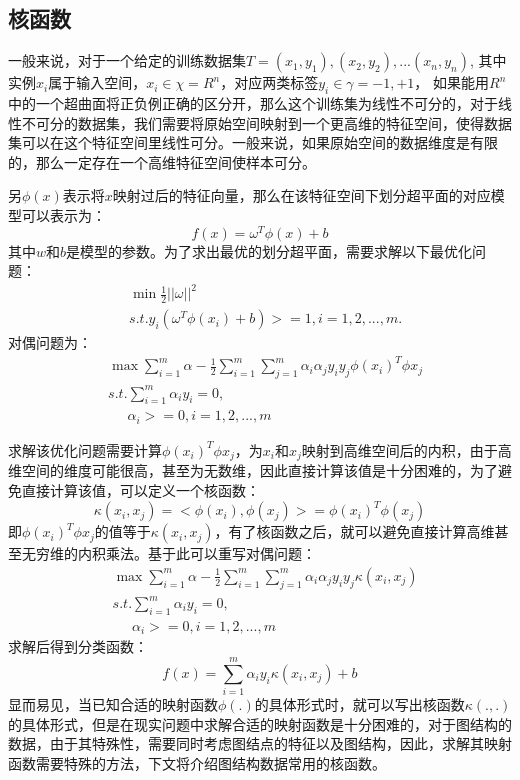 \subsection{核函数}
\par 一般来说，对于一个给定的训练数据集$T={(x_1, y_1), (x_2, y_2), ...(x_n, y_n)}$, 其中实例$x_i$属于输入空间，$x_i\in \chi=R^n$，对应两类标签$y_i\in \gamma={-1, +1}$， 如果能用$R^n$中的一个超曲面将正负例正确的区分开，那么这个训练集为线性不可分的，对于线性不可分的数据集，我们需要将原始空间映射到一个更高维的特征空间，使得数据集可以在这个特征空间里线性可分。一般来说，如果原始空间的数据维度是有限的，那么一定存在一个高维特征空间使样本可分。
\par 另$\phi(x)$表示将$x$映射过后的特征向量，那么在该特征空间下划分超平面的对应模型可以表示为：
$$f(x)=\omega^T\phi(x)+b$$
其中$w$和$b$是模型的参数。为了求出最优的划分超平面，需要求解以下最优化问题：
\begin{align*}
&\min \frac{1}{2} ||\omega||^2 \\
&s.t. y_i(\omega^T\phi(x_i)+b)>=1, i=1,2,...,m.
\end{align*}
对偶问题为：
\begin{align*}
&\max \sum_{i=1}^{m} \alpha - \frac{1}{2}\sum_{i=1}^{m}\sum_{j=1}^{m} \alpha_i\alpha_jy_iy_j\phi(x_i)^T\phi{x_j}\\
&s.t. \sum_{i=1}^m \alpha_i y_i = 0,\\
&\phantom {s.t.}\alpha_i >=0,  i=1,2,...,m
\end{align*}
\par 	求解该优化问题需要计算$\phi(x_i)^T\phi{x_j}$，为$x_i$和$x_j$映射到高维空间后的内积，由于高维空间的维度可能很高，甚至为无数维，因此直接计算该值是十分困难的，为了避免直接计算该值，可以定义一个核函数：
\begin{equation*}
\kappa(x_i, x_j) = <\phi(x_i), \phi(x_j)> = \phi(x_i)^T\phi(x_j)
\end{equation*}
即$\phi(x_i)^T\phi{x_j}$的值等于$\kappa(x_i, x_j) $，有了核函数之后，就可以避免直接计算高维甚至无穷维的内积乘法。基于此可以重写对偶问题：
\begin{align*}
&\max \sum_{i=1}^{m} \alpha - \frac{1}{2}\sum_{i=1}^{m}\sum_{j=1}^{m} \alpha_i\alpha_jy_iy_j\kappa(x_i, x_j) \\
&s.t. \sum_{i=1}^m \alpha_i y_i = 0,\\
&\phantom {s.t.}\alpha_i >=0,  i=1,2,...,m
\end{align*}
求解后得到分类函数：
\begin{equation*}
f(x)=\sum_{i=1}^m \alpha_iy_i \kappa(x_i, x_j) +b
\end{equation*}
显而易见，当已知合适的映射函数$\phi(.)$的具体形式时，就可以写出核函数$\kappa(., .)$的具体形式，但是在现实问题中求解合适的映射函数是十分困难的，对于图结构的数据，由于其特殊性，需要同时考虑图结点的特征以及图结构，因此，求解其映射函数需要特殊的方法，下文将介绍图结构数据常用的核函数。
